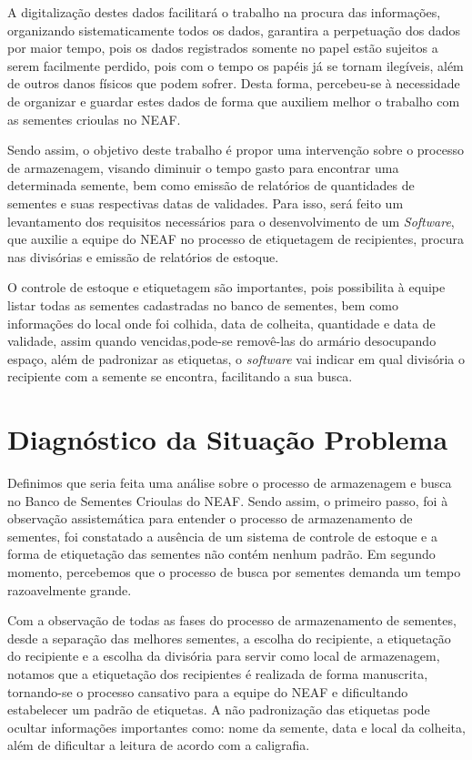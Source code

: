 \documentclass[12pt,a4paper]{article}
\begin{document}
A digitalização destes dados facilitará o trabalho na procura das informações, organizando sistematicamente todos os dados, garantira a perpetuação dos dados por maior tempo, pois os dados registrados somente no papel estão sujeitos a serem facilmente perdido, pois com o tempo os papéis já se tornam ilegíveis, além de outros danos físicos que podem sofrer. Desta forma, percebeu-se à necessidade de organizar e guardar estes dados de forma que auxiliem melhor o trabalho com as sementes crioulas no NEAF.

Sendo assim, o objetivo deste trabalho é propor uma intervenção sobre o processo de armazenagem, visando diminuir o tempo gasto para encontrar uma determinada semente, bem como emissão de relatórios de quantidades de sementes e suas respectivas datas de validades. Para isso, será feito um levantamento dos requisitos necessários para o desenvolvimento de um {\it Software}, que auxilie a equipe do NEAF no processo de etiquetagem de recipientes, procura nas divisórias e emissão de relatórios de estoque. 

O controle de estoque e etiquetagem são importantes, pois possibilita à equipe listar todas as sementes cadastradas no banco de sementes, bem como informações do local onde foi colhida, data de colheita, quantidade e data de validade, assim quando vencidas,pode-se removê-las do armário desocupando espaço, além de padronizar as etiquetas, o {\it software} vai indicar em qual divisória o recipiente com a semente se encontra, facilitando a sua busca.



\section{Diagnóstico da Situação Problema}

Definimos que seria feita uma análise sobre o processo de armazenagem e busca no Banco de Sementes Crioulas do NEAF. Sendo assim, o primeiro passo, foi à observação assistemática para entender o processo de armazenamento de sementes, foi constatado a ausência de um sistema de controle de estoque e a forma de etiquetação das sementes não contém nenhum padrão. Em segundo momento, percebemos que o processo de busca por sementes  demanda um tempo razoavelmente grande.

Com a observação de todas as fases do processo de armazenamento de sementes, desde a separação das melhores sementes, a escolha do recipiente, a etiquetação do recipiente e a escolha da divisória para servir como local de armazenagem, notamos que a etiquetação dos recipientes é realizada de forma manuscrita, tornando-se o processo cansativo para a equipe do NEAF e dificultando estabelecer um padrão de etiquetas. A não padronização das etiquetas pode ocultar informações importantes como: nome da semente, data e local da colheita, além de dificultar a leitura de acordo com a caligrafia. 
\end{document}
